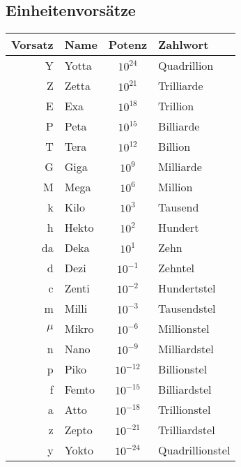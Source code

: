 \documentclass
[
  fontsize = 11pt,
  parskip  = half-,
  BCOR     = 0pt,
  DIV      = 11,
  draft,
  ngerman,
  dvipsnames
]
{scrartcl}
\begin{document}
\subsection*{Einheitenvorsätze}
\begin{center}
  \renewcommand{\arraystretch}{1.1}%
  \begin{tabular}{|r|l|c|l|}
    \hline
    \textbf{Vorsatz}  &
    \textbf{Name}     &
    \textbf{Potenz}   &
    \textbf{Zahlwort} \\
    \hline
    Y       & Yotta & $10^{24}$  & Quadrillion     \\
    Z       & Zetta & $10^{21}$  & Trilliarde      \\
    E       & Exa   & $10^{18}$  & Trillion        \\
    P       & Peta  & $10^{15}$  & Billiarde       \\
    T       & Tera  & $10^{12}$  & Billion         \\
    G       & Giga  & $10^{9}$   & Milliarde       \\
    M       & Mega  & $10^{6}$   & Million         \\
    k       & Kilo  & $10^{3}$   & Tausend         \\
    h       & Hekto & $10^{2}$   & Hundert         \\
    da      & Deka  & $10^{1}$   & Zehn            \\
    \hline
    d       & Dezi  & $10^{-1}$  & Zehntel         \\
    c       & Zenti & $10^{-2}$  & Hundertstel     \\
    m       & Milli & $10^{-3}$  & Tausendstel     \\
    $\mu$   & Mikro & $10^{-6}$  & Millionstel     \\
    n       & Nano  & $10^{-9}$  & Milliardstel    \\
    p       & Piko  & $10^{-12}$ & Billionstel     \\
    f       & Femto & $10^{-15}$ & Billiardstel    \\
    a       & Atto  & $10^{-18}$ & Trillionstel    \\
    z       & Zepto & $10^{-21}$ & Trilliardstel   \\
    y       & Yokto & $10^{-24}$ & Quadrillionstel \\
    \hline
  \end{tabular}%
\end{center}

\end{document}
